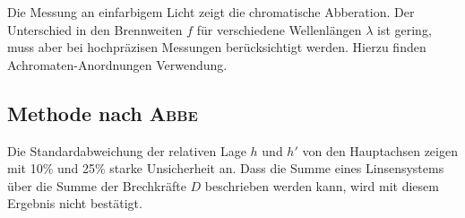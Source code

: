 Die Messung an einfarbigem Licht zeigt die chromatische Abberation.
Der Unterschied in den Brennweiten $f$ für verschiedene Wellenlängen $\lambda$ ist gering, muss aber bei hochpräzisen Messungen berücksichtigt werden.
Hierzu finden Achromaten-Anordnungen Verwendung.
\subsection{Methode nach \texorpdfstring{\textsc{Abbe}}{Abbe}}
Die Standardabweichung der relativen Lage $h$ und $h'$ von den Hauptachsen zeigen mit 10\% und 25\% starke Unsicherheit an.
Dass die Summe eines Linsensystems über die Summe der Brechkräfte $D$ beschrieben werden kann, wird mit diesem Ergebnis nicht bestätigt.